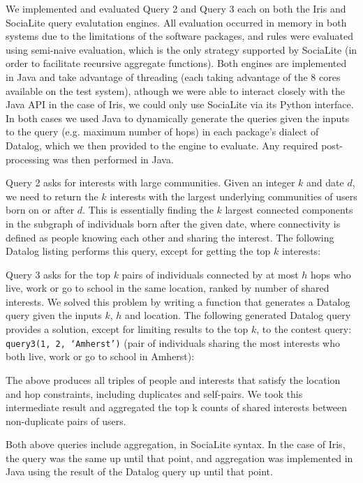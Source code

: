 \documentclass{article}
\begin{document}
\begin{multicols}{2}
We implemented and evaluated Query 2 and Query 3 each on both the Iris and SociaLite query evalutation engines. All evaluation occurred in memory in both systems due to the limitations of the software packages, and rules were evaluated using semi-naive evaluation, which is the only strategy supported by SociaLite (in order to facilitate recursive aggregate functions). Both engines are implemented in Java and take advantage of threading (each taking advantage of the 8 cores available on the test system), athough we were able to interact closely with the Java API in the case of Iris, we could only use SociaLite via its Python interface. In both cases we used Java to dynamically generate the queries given the inputs to the query (e.g. maximum number of hops) in each package's dialect of Datalog, which we then provided to the engine to evaluate. Any required post-processing was then performed in Java.

Query 2 asks for interests with large communities. Given an integer $k$ and date $d$, we need to return the $k$ interests with the largest underlying communities of users born on or after $d$. This is essentially finding the $k$ largest connected components in the subgraph of individuals born after the given date, where connectivity is defined as people knowing each other and sharing the interest. The following Datalog listing performs this query, except for getting the top $k$ interests:



Query 3 asks for the top $k$ pairs of individuals connected by at most $h$ hops who live, work or go to school in the same location, ranked by number of shared interests. We solved this problem by writing a function that generates a Datalog query given the inputs $k$, $h$ and location. The following generated Datalog query provides a solution, except for limiting results to the top $k$, to the contest query: \texttt{query3(1, 2, ‘Amherst’)} (pair of individuals sharing the most interests who both live, work or go to school in Amherst):



The above produces all triples of people and interests that satisfy the location and hop constraints, including duplicates and self-pairs. We took this intermediate result and aggregated the top k counts of shared interests between non-duplicate pairs of users.

Both above queries include aggregation, in SociaLite syntax. In the case of Iris, the query was the same up until that point, and aggregation was implemented in Java using the result of the Datalog query up until that point.		
																																							

\end{multicols}
\end{document}
